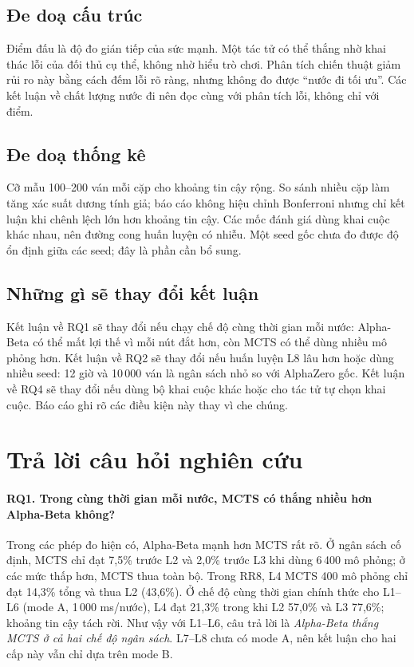 \subsection{Đe doạ cấu trúc}
Điểm đấu là độ đo gián tiếp của sức mạnh. Một tác tử có thể thắng nhờ khai thác lỗi của đối thủ
cụ thể, không nhờ hiểu trò chơi. Phân tích chiến thuật giảm rủi ro này bằng cách đếm lỗi rõ
ràng, nhưng không đo được ``nước đi tối ưu''. Các kết luận về chất lượng nước đi nên đọc cùng
với phân tích lỗi, không chỉ với điểm.

\subsection{Đe doạ thống kê}
Cỡ mẫu 100--200 ván mỗi cặp cho khoảng tin cậy rộng. So sánh nhiều cặp làm tăng xác suất dương
tính giả; báo cáo không hiệu chỉnh Bonferroni nhưng chỉ kết luận khi chênh lệch lớn hơn khoảng
tin cậy. Các mốc đánh giá dùng khai cuộc khác nhau, nên đường cong huấn luyện có nhiễu. Một seed
gốc chưa đo được độ ổn định giữa các seed; đây là phần cần bổ sung.

\subsection{Những gì sẽ thay đổi kết luận}
Kết luận về RQ1 sẽ thay đổi nếu chạy chế độ cùng thời gian mỗi nước: Alpha-Beta có thể mất lợi
thế vì mỗi nút đắt hơn, còn MCTS có thể dùng nhiều mô phỏng hơn. Kết luận về RQ2 sẽ thay đổi
nếu huấn luyện L8 lâu hơn hoặc dùng nhiều seed: 12 giờ và 10\,000 ván là ngân sách nhỏ so với
AlphaZero gốc. Kết luận về RQ4 sẽ thay đổi nếu dùng bộ khai cuộc khác hoặc cho tác tử tự chọn
khai cuộc. Báo cáo ghi rõ các điều kiện này thay vì che chúng.

\section{Trả lời câu hỏi nghiên cứu}
\label{sec:tn-tra-loi-rq}
\paragraph{RQ1. Trong cùng thời gian mỗi nước, MCTS có thắng nhiều hơn Alpha-Beta không?}
Trong các phép đo hiện có, Alpha-Beta mạnh hơn MCTS rất rõ. Ở ngân sách cố định, MCTS chỉ đạt
7,5\% trước L2 và 2,0\% trước L3 khi dùng 6\,400 mô phỏng; ở các mức thấp hơn, MCTS thua toàn
bộ. Trong RR8, L4 MCTS 400 mô phỏng chỉ đạt 14,3\% tổng và thua L2 (43,6\%). Ở chế độ cùng
thời gian chính thức cho L1--L6 (mode A, 1\,000 ms/nước), L4 đạt 21,3\% trong khi L2 57,0\% và
L3 77,6\%; khoảng tin cậy tách rời. Như vậy với L1--L6, câu trả lời là \emph{Alpha-Beta thắng
MCTS ở cả hai chế độ ngân sách}. L7--L8 chưa có mode A, nên kết luận cho hai cấp này vẫn chỉ
dựa trên mode B.

